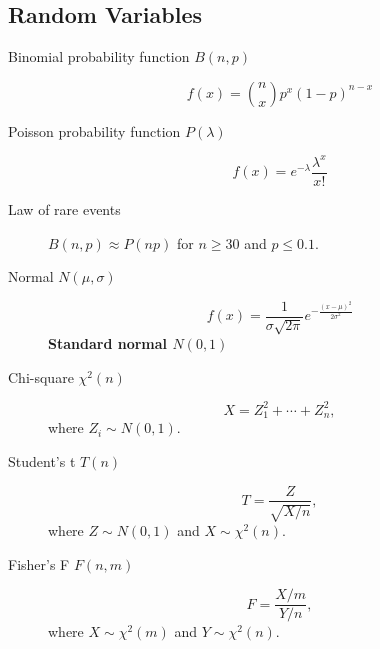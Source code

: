 \begin{multicols*}{2}
	\subsection*{Random Variables}

	\begin{tcolorbox}[hbox, title=Discrete]
		\begin{minipage}{0.4\textwidth}
			\begin{description}
				\item [Binomial probability function $B(n,p)$]
				      \[f(x)=\binom{n}{x}p^x (1-p)^{n-x}\]
				\item [Poisson probability function $P(\lambda)$]
				      \[f(x)=e^{-\lambda}\frac{\lambda^x}{x!}\]
				\item [Law of rare events] $B(n,p)\approx P(np)$ for $n\geq 30$ and $p\leq 0.1$.
			\end{description}
		\end{minipage}
	\end{tcolorbox}

  \begin{tcolorbox}[hbox, title=Continuous]
		\begin{minipage}{0.4\textwidth}
			\begin{description}
				\item[Normal $N(\mu,\sigma)$]
              \[f(x)= \frac{1}{\sigma\sqrt{2\pi}}e^{-\frac{(x-\mu)^2}{2\sigma^2}}\]
              \textbf{Standard normal $N(0,1)$}
				\item[Chi-square $\chi^2(n)$]
              \[X = Z_1^2+\cdots +Z_n^2,\]
              where $Z_i\sim N(0,1)$.
        \item[Student's t $T(n)$] 
        \[T = \frac{Z}{\sqrt{X/n}},\]
        where $Z\sim N(0,1)$ and $X\sim \chi^2(n)$.
        \item[Fisher's F $F(n,m)$]
        \[F = \frac{X/m}{Y/n},\]
        where $X\sim \chi^2(m)$ and $Y\sim \chi^2(n)$.
			\end{description}
		\end{minipage}
	\end{tcolorbox}

\end{multicols*}